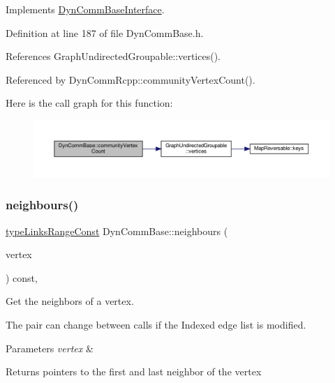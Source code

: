 Implements \hyperlink{classDynCommBaseInterface_a2b4c4a130a2de5eb6cd79af88969ef3c}{Dyn\+Comm\+Base\+Interface}.



Definition at line 187 of file Dyn\+Comm\+Base.\+h.



References Graph\+Undirected\+Groupable\+::vertices().



Referenced by Dyn\+Comm\+Rcpp\+::community\+Vertex\+Count().

Here is the call graph for this function\+:
\nopagebreak
\begin{figure}[H]
\begin{center}
\leavevmode
\includegraphics[width=350pt]{classDynCommBase_ad02f1853b63e1ceaf24b05cfdbcf7a49_cgraph}
\end{center}
\end{figure}
\mbox{\label{classDynCommBase_a3500faab82a0547422b2202b79f49718}} 
\subsubsection{\texorpdfstring{neighbours()}{neighbours()}}
{\footnotesize\ttfamily \hyperlink{graphInterface_8h_ae8d27008f15586bbf419af7ad2e0a48a}{type\+Links\+Range\+Const} Dyn\+Comm\+Base\+::neighbours (\begin{DoxyParamCaption}\item[{\hyperlink{edge_8h_a5fbd20c46956d479cb10afc9855223f6}{type\+Vertex}}]{vertex }\end{DoxyParamCaption}) const\hspace{0.3cm}{\ttfamily [inline]}, {\ttfamily [virtual]}}



Get the neighbors of a vertex. 

The pair can change between calls if the Indexed edge list is modified. 
\begin{DoxyParams}{Parameters}
{\em vertex} & \\
\hline
\end{DoxyParams}
\begin{DoxyReturn}{Returns}
pointers to the first and last neighbor of the vertex 
\end{DoxyReturn}


